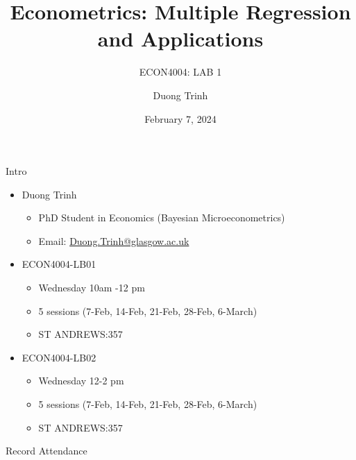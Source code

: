 \documentclass[
  10pt,
  ignorenonframetext,
]{beamer}
\title{Econometrics: Multiple Regression and Applications}
\subtitle{ECON4004: LAB 1}
\author{Duong Trinh}
\date{February 7, 2024}
\institute{University of Glasgow}
\providecommand{\tightlist}{%
  \setlength{\itemsep}{0pt}\setlength{\parskip}{0pt}}
\begin{document}
\frame{\titlepage}

\begin{frame}{Intro}
\protect\hypertarget{intro}{}
\begin{itemize}
\tightlist
\item
  Duong Trinh

  \begin{itemize}
  \tightlist
  \item
    PhD Student in Economics (Bayesian Microeconometrics)
  \item
    Email: \underline{Duong.Trinh@glasgow.ac.uk}
  \end{itemize}
\end{itemize}

\vspace{3mm}

\begin{itemize}
\tightlist
\item
  ECON4004-LB01

  \begin{itemize}
  \tightlist
  \item
    Wednesday 10am -12 pm
  \item
    5 sessions (7-Feb, 14-Feb, 21-Feb, 28-Feb, 6-March)
  \item
    ST ANDREWS:357
  \end{itemize}
\item
  ECON4004-LB02

  \begin{itemize}
  \tightlist
  \item
    Wednesday 12-2 pm
  \item
    5 sessions (7-Feb, 14-Feb, 21-Feb, 28-Feb, 6-March)
  \item
    ST ANDREWS:357
  \end{itemize}
\end{itemize}
\end{frame}

\begin{frame}{Record Attendance}
\protect\hypertarget{record-attendance}{}
\end{frame}
\end{document}
